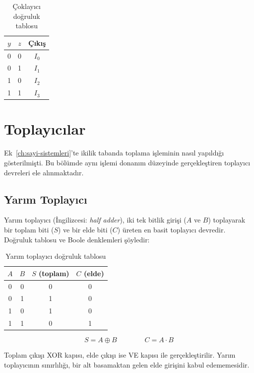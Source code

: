 \begin{table}[H]
\centering
\caption{Çoklayıcı doğruluk tablosu}
\label{tab:B.8}
\begin{tabular}{cc|c}
\toprule
$y$ & $z$ & \textbf{Çıkış} \\
\midrule
0 & 0 & $I_0$ \\
0 & 1 & $I_1$ \\
1 & 0 & $I_2$ \\
1 & 1 & $I_3$ \\
\bottomrule
\end{tabular}
\end{table}


\section{Toplayıcılar}
\label{sec:toplayicilar}

Ek~\ref{ch:sayi-sistemleri}'te ikilik tabanda toplama işleminin nasıl yapıldığı gösterilmişti. Bu bölümde aynı işlemi donanım düzeyinde gerçekleştiren toplayıcı devreleri ele alınmaktadır.

\subsection{Yarım Toplayıcı}

Yarım toplayıcı (İngilizcesi: \textit{half adder}), iki tek bitlik girişi ($A$ ve $B$) toplayarak bir toplam biti ($S$) ve bir elde biti ($C$) üreten en basit toplayıcı devredir. Doğruluk tablosu ve Boole denklemleri şöyledir:

\begin{table}[H]
\centering
\caption{Yarım toplayıcı doğruluk tablosu}
\label{tab:ekB-yarim-toplayici}
\begin{tabular}{cc|cc}
\toprule
$A$ & $B$ & $S$ (toplam) & $C$ (elde) \\
\midrule
0 & 0 & 0 & 0 \\
0 & 1 & 1 & 0 \\
1 & 0 & 1 & 0 \\
1 & 1 & 0 & 1 \\
\bottomrule
\end{tabular}
\end{table}

\[
S = A \oplus B \qquad\qquad C = A \cdot B
\]

Toplam çıkışı XOR kapısı, elde çıkışı ise VE kapısı ile gerçekleştirilir. Yarım toplayıcının sınırlılığı, bir alt basamaktan gelen elde girişini kabul edememesidir.

